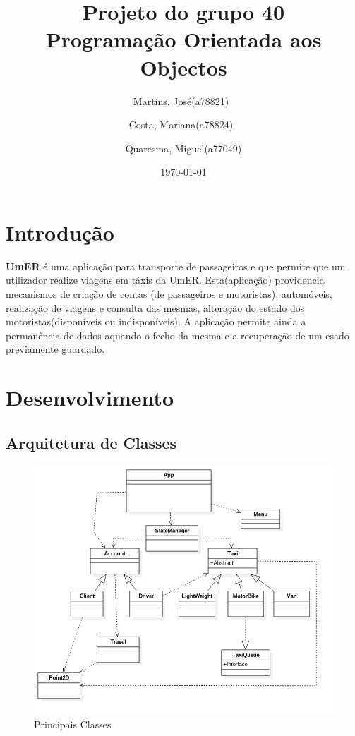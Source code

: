 \documentclass[a4paper,12pt,portuguese]{report}
\title{Projeto do grupo 40 \\ Programação Orientada aos Objectos}
\author{Martins, José(a78821)\
        \and
        Costa, Mariana(a78824)\
        \and
        Quaresma, Miguel(a77049)
        }
\date{\today}
\begin{document}
 
\begin{titlepage}
\maketitle
\end{titlepage}
 
\tableofcontents
 
\chapter{Introdução}
\textbf{UmER} é uma aplicação para transporte de passageiros e que permite que um utilizador realize viagens em táxis da UmER. Esta(aplicação) providencia mecanismos de criação de contas (de passageiros e motoristas), automóveis, realização de viagens e consulta das mesmas, alteração do estado dos motoristas(disponíveis ou indisponíveis). A aplicação permite ainda a permanência de dados aquando o fecho da mesma e a recuperação de um esado previamente guardado.

\chapter{Desenvolvimento}

\section{Arquitetura de Classes}

\begin{figure}[ht!]
    \centering
        \includegraphics[width=120mm]{graph.jpg}
    \caption{Principais Classes}
\end{figure}
\end{document}

